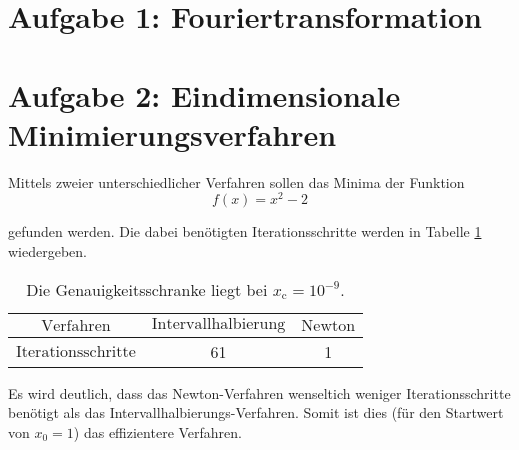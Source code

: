 



\maketitle

\section*{Aufgabe 1: Fouriertransformation}

\section*{Aufgabe 2: Eindimensionale Minimierungsverfahren}

Mittels zweier unterschiedlicher Verfahren sollen das Minima der Funktion
\begin{equation*}
  f(x) = x^2 - 2
\end{equation*}

\noindent
gefunden werden. Die dabei benötigten Iterationsschritte werden in Tabelle
\ref{tab:A2} wiedergeben.

\begin{table}
\centering
\begin{tabular}{c c c}
  \toprule
  $\text{Verfahren}$          & $\text{Intervallhalbierung}$ & $\text{Newton}$  \\
  \midrule
  $\text{Iterationsschritte}$ & 61                           & 1                \\
  \bottomrule
\end{tabular}
\caption{Die Genauigkeitsschranke liegt bei $x_{\text{c}} = 10^{-9}$.}
\label{tab:A2}
\end{table}

\noindent
Es wird deutlich, dass das Newton-Verfahren wenseltich weniger Iterationsschritte
benötigt als das Intervallhalbierungs-Verfahren. Somit ist dies (für den Startwert von
$x_0 = 1$) das effizientere Verfahren.



